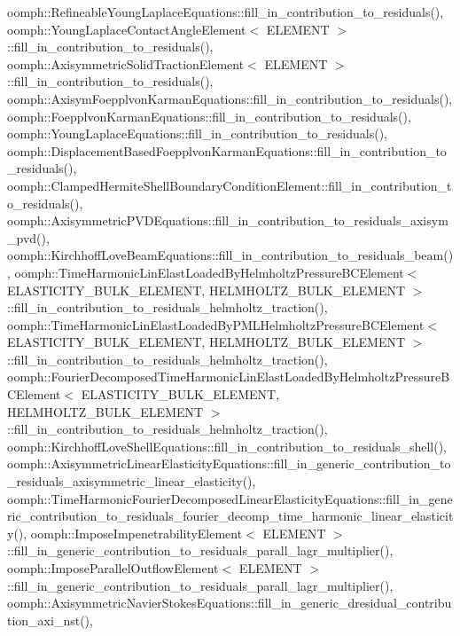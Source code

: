 oomph\+::\+Refineable\+Young\+Laplace\+Equations\+::fill\+\_\+in\+\_\+contribution\+\_\+to\+\_\+residuals(), oomph\+::\+Young\+Laplace\+Contact\+Angle\+Element$<$ E\+L\+E\+M\+E\+N\+T $>$\+::fill\+\_\+in\+\_\+contribution\+\_\+to\+\_\+residuals(), oomph\+::\+Axisymmetric\+Solid\+Traction\+Element$<$ E\+L\+E\+M\+E\+N\+T $>$\+::fill\+\_\+in\+\_\+contribution\+\_\+to\+\_\+residuals(), oomph\+::\+Axisym\+Foepplvon\+Karman\+Equations\+::fill\+\_\+in\+\_\+contribution\+\_\+to\+\_\+residuals(), oomph\+::\+Foepplvon\+Karman\+Equations\+::fill\+\_\+in\+\_\+contribution\+\_\+to\+\_\+residuals(), oomph\+::\+Young\+Laplace\+Equations\+::fill\+\_\+in\+\_\+contribution\+\_\+to\+\_\+residuals(), oomph\+::\+Displacement\+Based\+Foepplvon\+Karman\+Equations\+::fill\+\_\+in\+\_\+contribution\+\_\+to\+\_\+residuals(), oomph\+::\+Clamped\+Hermite\+Shell\+Boundary\+Condition\+Element\+::fill\+\_\+in\+\_\+contribution\+\_\+to\+\_\+residuals(), oomph\+::\+Axisymmetric\+P\+V\+D\+Equations\+::fill\+\_\+in\+\_\+contribution\+\_\+to\+\_\+residuals\+\_\+axisym\+\_\+pvd(), oomph\+::\+Kirchhoff\+Love\+Beam\+Equations\+::fill\+\_\+in\+\_\+contribution\+\_\+to\+\_\+residuals\+\_\+beam(), oomph\+::\+Time\+Harmonic\+Lin\+Elast\+Loaded\+By\+Helmholtz\+Pressure\+B\+C\+Element$<$ E\+L\+A\+S\+T\+I\+C\+I\+T\+Y\+\_\+\+B\+U\+L\+K\+\_\+\+E\+L\+E\+M\+E\+N\+T, H\+E\+L\+M\+H\+O\+L\+T\+Z\+\_\+\+B\+U\+L\+K\+\_\+\+E\+L\+E\+M\+E\+N\+T $>$\+::fill\+\_\+in\+\_\+contribution\+\_\+to\+\_\+residuals\+\_\+helmholtz\+\_\+traction(), oomph\+::\+Time\+Harmonic\+Lin\+Elast\+Loaded\+By\+P\+M\+L\+Helmholtz\+Pressure\+B\+C\+Element$<$ E\+L\+A\+S\+T\+I\+C\+I\+T\+Y\+\_\+\+B\+U\+L\+K\+\_\+\+E\+L\+E\+M\+E\+N\+T, H\+E\+L\+M\+H\+O\+L\+T\+Z\+\_\+\+B\+U\+L\+K\+\_\+\+E\+L\+E\+M\+E\+N\+T $>$\+::fill\+\_\+in\+\_\+contribution\+\_\+to\+\_\+residuals\+\_\+helmholtz\+\_\+traction(), oomph\+::\+Fourier\+Decomposed\+Time\+Harmonic\+Lin\+Elast\+Loaded\+By\+Helmholtz\+Pressure\+B\+C\+Element$<$ E\+L\+A\+S\+T\+I\+C\+I\+T\+Y\+\_\+\+B\+U\+L\+K\+\_\+\+E\+L\+E\+M\+E\+N\+T, H\+E\+L\+M\+H\+O\+L\+T\+Z\+\_\+\+B\+U\+L\+K\+\_\+\+E\+L\+E\+M\+E\+N\+T $>$\+::fill\+\_\+in\+\_\+contribution\+\_\+to\+\_\+residuals\+\_\+helmholtz\+\_\+traction(), oomph\+::\+Kirchhoff\+Love\+Shell\+Equations\+::fill\+\_\+in\+\_\+contribution\+\_\+to\+\_\+residuals\+\_\+shell(), oomph\+::\+Axisymmetric\+Linear\+Elasticity\+Equations\+::fill\+\_\+in\+\_\+generic\+\_\+contribution\+\_\+to\+\_\+residuals\+\_\+axisymmetric\+\_\+linear\+\_\+elasticity(), oomph\+::\+Time\+Harmonic\+Fourier\+Decomposed\+Linear\+Elasticity\+Equations\+::fill\+\_\+in\+\_\+generic\+\_\+contribution\+\_\+to\+\_\+residuals\+\_\+fourier\+\_\+decomp\+\_\+time\+\_\+harmonic\+\_\+linear\+\_\+elasticity(), oomph\+::\+Impose\+Impenetrability\+Element$<$ E\+L\+E\+M\+E\+N\+T $>$\+::fill\+\_\+in\+\_\+generic\+\_\+contribution\+\_\+to\+\_\+residuals\+\_\+parall\+\_\+lagr\+\_\+multiplier(), oomph\+::\+Impose\+Parallel\+Outflow\+Element$<$ E\+L\+E\+M\+E\+N\+T $>$\+::fill\+\_\+in\+\_\+generic\+\_\+contribution\+\_\+to\+\_\+residuals\+\_\+parall\+\_\+lagr\+\_\+multiplier(), oomph\+::\+Axisymmetric\+Navier\+Stokes\+Equations\+::fill\+\_\+in\+\_\+generic\+\_\+dresidual\+\_\+contribution\+\_\+axi\+\_\+nst(), 